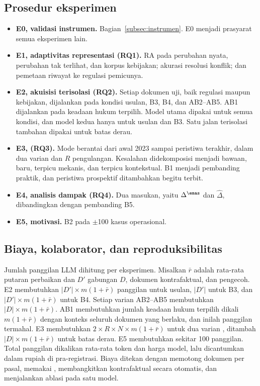 
\subsection{Prosedur eksperimen}
\label{subsec:prosedur}

\begin{itemize}[leftmargin=*,nosep]
  \item \textbf{E0, validasi instrumen.} Bagian~\ref{subsec:instrumen}. E0 menjadi prasyarat semua eksperimen lain.
  \item \textbf{E1, adaptivitas representasi (RQ1).} RA pada perubahan nyata, perubahan tak terlihat, dan korpus kebijakan; akurasi resolusi konflik; dan pemetaan riwayat  ke regulasi pemicunya.
  \item \textbf{E2, akuisisi terisolasi (RQ2).} Setiap dokumen uji, baik regulasi maupun kebijakan, dijalankan pada kondisi usulan, B3, B4, dan AB2--AB5. AB1 dijalankan pada keadaan hukum terpilih. Model utama dipakai untuk semua kondisi, dan model kedua hanya untuk usulan dan B3. Satu jalan terisolasi tambahan dipakai untuk batas derau.
  \item \textbf{E3,  (RQ3).} Mode berantai dari  awal 2023 sampai peristiwa terakhir, dalam dua varian  dan $R$ pengulangan. Kesalahan didekomposisi menjadi bawaan, baru, terpicu mekanis, dan terpicu kontekstual. B1 menjadi pembanding praktik, dan peristiwa prospektif ditambahkan begitu terbit.
  \item \textbf{E4, analisis dampak (RQ4).} Dua masukan, yaitu $\Delta^{\emas}$ dan $\hat{\Delta}$, dibandingkan dengan pembanding B5.
  \item \textbf{E5, motivasi.} B2 pada $\pm$100 kasus operasional.
\end{itemize}

\subsection{Biaya, kolaborator, dan reproduksibilitas}
\label{subsec:biaya}

Jumlah panggilan LLM dihitung per eksperimen. Misalkan $\bar{r}$ adalah rata-rata putaran perbaikan dan $D'$ gabungan $D$, dokumen kontrafaktual, dan pengecoh. E2 membutuhkan $|D'| \times m(1+\bar{r})$ panggilan untuk usulan, $|D'|$ untuk B3, dan $|D'| \times m(1+\bar{r})$ untuk B4. Setiap varian AB2--AB5 membutuhkan $|D| \times m(1+\bar{r})$. AB1 membutuhkan jumlah keadaan hukum terpilih dikali $m(1+\bar{r})$ dengan konteks seluruh dokumen yang berlaku, dan inilah panggilan termahal. E3 membutuhkan $2 \times R \times N \times m(1+\bar{r})$ untuk dua varian , ditambah $|D| \times m(1+\bar{r})$ untuk batas derau. E5 membutuhkan sekitar 100 panggilan. Total panggilan dikalikan rata-rata token dan harga model, lalu dicantumkan dalam rupiah di pra-registrasi. Biaya ditekan dengan memotong dokumen per pasal, memakai , membangkitkan kontrafaktual secara otomatis, dan menjalankan ablasi pada satu model.

